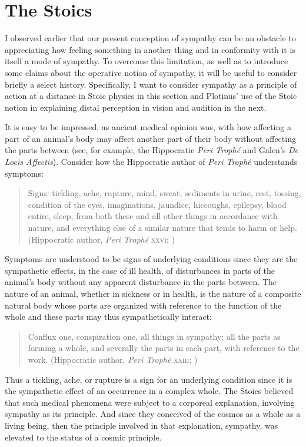 \section{The Stoics} %
\label{sec:the_stoics}

I observed earlier that our present conception of sympathy can be an obstacle to appreciating how feeling something in another thing and in conformity with it is itself a mode of sympathy. To overcome this limitation, as well as to introduce some claims about the operative notion of sympathy, it will be useful to consider briefly a select history. Specifically, I want to consider sympathy as a principle of action at a distance in Stoic physics in this section and Plotinus' use of the Stoic notion in explaining distal perception in vision and audition in the next. 

It is easy to be impressed, as ancient medical opinion was, with how affecting a part of an animal's body may affect another part of their body without affecting the parts between (see, for example, the Hippocratic \emph{Peri Troph\'{e}} and Galen's \emph{De Locis Affectis}). Consider how the Hippocratic author of \emph{Peri Troph\'{e}} understands symptoms: 
\begin{quote}
	Signs: tickling, ache, rupture, mind, sweat, sediments in urine, rest, tossing, condition of the eyes, imaginations, jaundice, hiccoughs, epilepsy, blood entire, sleep, from both these and all other things in accordance with nature, and everything else of a similar nature that tends to harm or help. (Hippocratic author, \emph{Peri Troph\'{e}} \textsc{xxvi}; \citealt[351]{Jones:1957aa})
\end{quote}
Symptoms are understood to be signs of underlying conditions since they are the sympathetic effects, in the case of ill health, of disturbances in parts of the animal's body without any apparent disturbance in the parts between. The nature of an animal, whether in sickness or in health, is the nature of a composite natural body whose parts are organized with reference to the function of the whole and these parts may thus sympathetically interact:
\begin{quote}
	Conflux one, conspiration one, all things in sympathy; all the parts as forming a whole, and severally the parts in each part, with reference to the work. (Hippocratic author, \emph{Peri Troph\'{e}} \textsc{xxiii}; \citealt[351]{Jones:1957aa})
\end{quote}
Thus a tickling, ache, or rupture is a sign for an underlying condition since it is the sympathetic effect of an occurrence in a complex whole. The Stoics believed that such medical phenomena were subject to a corporeal explanation, involving sympathy as its principle. And since they conceived of the cosmos as a whole as a living being, then the principle involved in that explanation, sympathy, was elevated to the status of a cosmic principle.


